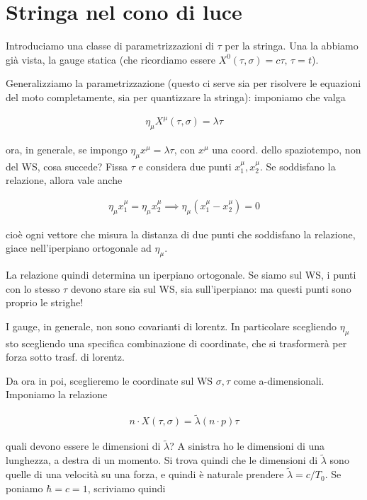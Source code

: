 \documentclass{report}
\begin{document}
\section{Stringa nel cono di luce}

Introduciamo una classe di parametrizzazioni di \(\tau\) per la stringa. Una la abbiamo già vista, la gauge statica (che ricordiamo essere \(X^0(\tau, \sigma) = c\tau, \, \tau = t\)). 

Generalizziamo la parametrizzazione (questo ci serve sia per risolvere le equazioni del moto completamente, sia per quantizzare la stringa): imponiamo che valga 

\begin{align}
    \eta_{\mu}X^\mu(\tau,\sigma) = \lambda \tau
\end{align}

ora, in generale, se impongo \(\eta_{\mu}x^\mu = \lambda \tau\), con \(x^\mu\) una coord. dello spaziotempo, non del WS, cosa succede? Fissa \(\tau\) e considera due punti \(x_1^\mu, x_2^\mu\). Se soddisfano la relazione, allora vale anche 

\begin{align}
    \eta_{\mu}x_1^\mu = \eta_{\mu}x_2^\mu \implies  \eta_{\mu}(x_1^\mu - x_2^\mu) = 0 
\end{align}

cioè ogni vettore che misura la distanza di due punti che soddisfano la relazione, giace nell'iperpiano ortogonale ad \(\eta_\mu\). 

La relazione quindi determina un iperpiano ortogonale. Se siamo sul WS, i punti con lo stesso \(\tau\) devono stare sia sul WS, sia sull'iperpiano: ma questi punti sono proprio le strighe! 

I gauge, in generale, non sono covarianti di lorentz. In particolare scegliendo \(\eta_\mu\) sto scegliendo una specifica combinazione di coordinate, che si trasformerà per forza sotto trasf. di lorentz. 
 
Da ora in poi, sceglieremo le coordinate sul WS \(\sigma, \tau\) come a-dimensionali. Imponiamo la relazione 

\begin{align}
    n \cdot X (\tau, \sigma) = \tilde{\lambda} (n\cdot p)\tau 
\end{align}

quali devono essere le dimensioni di \(\tilde{\lambda}\)? A sinistra ho le dimensioni di una lunghezza, a destra di un momento. Si trova quindi che le dimensioni di \(\tilde{\lambda}\) sono quelle di una velocità su una forza, e quindi è naturale prendere \(\tilde{\lambda} = c/T_0\). Se poniamo \(\hbar = c = 1\), scriviamo quindi 
\end{document}
